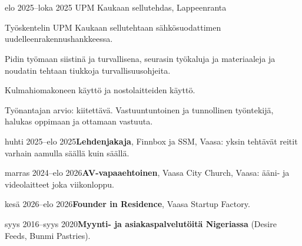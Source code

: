 \documentclass[a4paper,11pt]{article}
\begin{document}
\section{}
\begin{cventry}{elo 2025--loka 2025}{}
  UPM Kaukaan sellutehdas, Lappeenranta\par
  Työskentelin UPM Kaukaan sellutehtaan sähkösuodattimen uudelleenrakennushankkeessa.\par
  Pidin työmaan siistinä ja turvallisena, seurasin työkaluja ja materiaaleja ja noudatin tehtaan tiukkoja turvallisuusohjeita.\par
  Kulmahiomakoneen käyttö ja nostolaitteiden käyttö.\par
  Työnantajan arvio: kiitettävä. Vastuuntuntoinen ja tunnollinen työntekijä, halukas oppimaan ja ottamaan vastuuta.
\end{cventry}
\begin{cventry}{huhti 2025--elo 2025}{\textbf{Lehdenjakaja}, Finnbox ja SSM, Vaasa: yksin tehtävät reitit varhain aamulla säällä kuin säällä.}
\end{cventry}
\begin{cventry}{marras 2024--elo 2026}{\textbf{AV-vapaaehtoinen}, Vaasa City Church, Vaasa: ääni- ja videolaitteet joka viikonloppu.}
\end{cventry}
\begin{cventry}{kesä 2026--elo 2026}{\textbf{Founder in Residence}, Vaasa Startup Factory.}
\end{cventry}
\begin{cventry}{syys 2016--syys 2020}{\textbf{Myynti- ja asiakaspalvelutöitä Nigeriassa} (Desire Feeds, Bunmi Pastries).}
\end{cventry}

\section{}

\section{}
\end{document}
